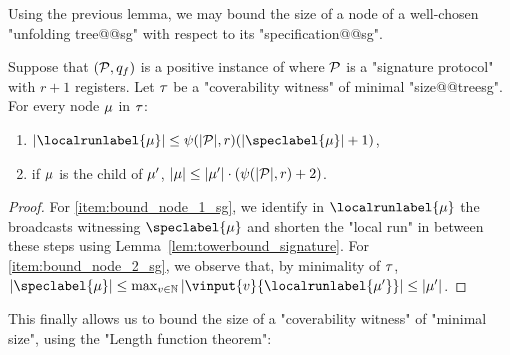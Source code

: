 


Using the previous lemma, we may bound the size of a node of a well-chosen "unfolding tree@@sg" with respect to its "specification@@sg".

\begin{lemma}
\label{lem:bounds_tree_sg}
Suppose that $(\mathcal{P}, q_f)$ is a positive instance of \COVER where $\mathcal{P}$ is a "signature protocol" with $r+1$ registers. Let $\tau$ be a "coverability witness" of minimal "size@@treesg".
For every node $\mu$ in $\tau$: \begin{enumerate}
\item \label{item:bound_node_1_sg} $\size{\localrunlabel{\node}} \leq \towerfun(\size{\prot}, r) (\size{\speclabel{\node}}+1)$,
\item \label{item:bound_node_2_sg} if $\mu$ is the child of $\mu'$, $|\mu| \leq |\mu'| \cdot (\psi(|\mathcal{P}|,r)+2)$.
\end{enumerate} 
\end{lemma}
\begin{proof}
For \ref{item:bound_node_1_sg}, we identify in $\localrunlabel{\node}$ the broadcasts witnessing $\speclabel{\node}$ and shorten the "local run" in between these steps using Lemma~\ref{lem:towerbound_signature}.
For \ref{item:bound_node_2_sg}, we observe that, by minimality of $\tau$, $\size{\speclabel{\node}} \leq \max_{v \in \nats} \size{\vinput{v}{\localrunlabel{\node'}}} \leq \size{\node'}$.  
\end{proof}

This finally allows us to bound the size of a "coverability witness" of "minimal size", using the "Length function theorem":

